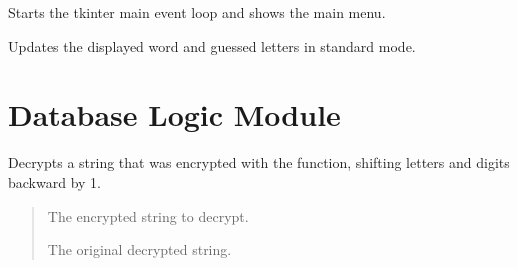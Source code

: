 \documentclass[letterpaper,10pt,english]{sphinxmanual}
\begin{document}
\begin{fulllineitems}

\begin{fulllineitems}
\label{\detokenize{modules:GUI.HangmanGUI.start}}
\pysigstartsignatures
{}
\pysigstopsignatures
\sphinxAtStartPar
Starts the tkinter main event loop and shows the main menu.

\end{fulllineitems}


\begin{fulllineitems}
\label{\detokenize{modules:GUI.HangmanGUI.update_word}}
\pysigstartsignatures
{}
\pysigstopsignatures
\sphinxAtStartPar
Updates the displayed word and guessed letters in standard mode.

\end{fulllineitems}


\end{fulllineitems}



\chapter{Database Logic Module}
\label{\detokenize{modules:module-Database_Logic}}\label{\detokenize{modules:database-logic-module}}

\begin{fulllineitems}
\label{\detokenize{modules:Database_Logic.decrypt}}
\pysigstartsignatures
{}
\pysigstopsignatures
\sphinxAtStartPar
Decrypts a string that was encrypted with the  function,
shifting letters and digits backward by 1.
\begin{quote}\begin{description}
\sphinxAtStartPar
{} \textendash{} The encrypted string to decrypt.

\sphinxAtStartPar
The original decrypted string.

\end{description}\end{quote}

\end{fulllineitems}
\end{document}
